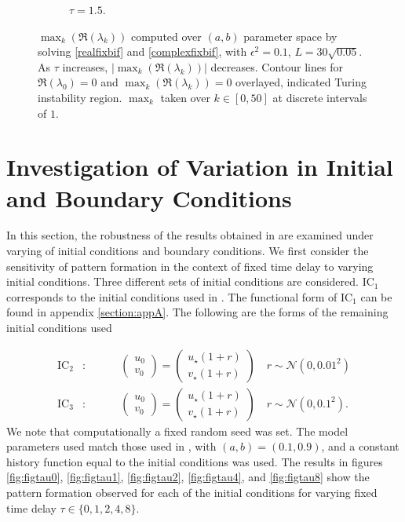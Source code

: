 \begin{figure}[H]
\begin{subfigure}[b]{0.45\textwidth}
        \caption{$\tau=1.5$.}
        \label{}
    \end{subfigure}
    \caption{$\max_k(\Re(\lambda_k))$ computed over $(a,b)$ parameter space by solving \eqref{realfixbif} and \eqref{complexfixbif}, with $\epsilon^2=0.1$, $L=30\sqrt{0.05}$. As $\tau$ increases, $|\max_k(\Re(\lambda_k))|$ decreases. Contour lines for $\Re(\lambda_0)=0$ and $\max_k(\Re(\lambda_k))=0$ overlayed, indicated Turing instability region. $\max_k$ taken over $k\in[0, 50]$ at discrete intervals of $1$.}
    \label{fig:fixbif2}
\end{figure}
\section{Investigation of Variation in Initial and Boundary Conditions}
In this section, the robustness of the results obtained in \cite{gaffmonk} are examined under varying of initial conditions and boundary conditions. We first consider the sensitivity of pattern formation in the context of fixed time delay to varying initial conditions. Three different sets of initial conditions are considered. $\text{IC}_1$ corresponds to the initial conditions used in \cite{gaffmonk}. The functional form of $\text{IC}_1$ can be found in appendix \ref{section:appA}. The following are the forms of the remaining initial conditions used

\begin{align}\label{ICs}
\text{IC}_2&:\quad\quad\quad\begin{pmatrix}u_0\\v_0\end{pmatrix}=\begin{pmatrix}u_\star(1+r)\\v_\star(1+r)\end{pmatrix}\quad r\sim\mathcal{N}\left(0,0.01^2\right)\\
\text{IC}_3&:\quad\quad\quad\begin{pmatrix}u_0\\v_0\end{pmatrix}=\begin{pmatrix}u_\star(1+r)\\v_\star(1+r)\end{pmatrix}\quad r\sim\mathcal{N}\left(0,0.1^2\right).
\end{align}
We note that computationally a fixed random seed was set. The model parameters used match those used in \cite{gaffmonk}, with $(a,b)=(0.1,0.9)$, and a constant history function equal to the initial conditions was used. The results in figures \ref{fig:figtau0}, \ref{fig:figtau1}, \ref{fig:figtau2}, \ref{fig:figtau4}, and \ref{fig:figtau8} show the pattern formation observed for each of the initial conditions for varying fixed time delay $\tau\in\{0,1,2,4,8 \}$.


